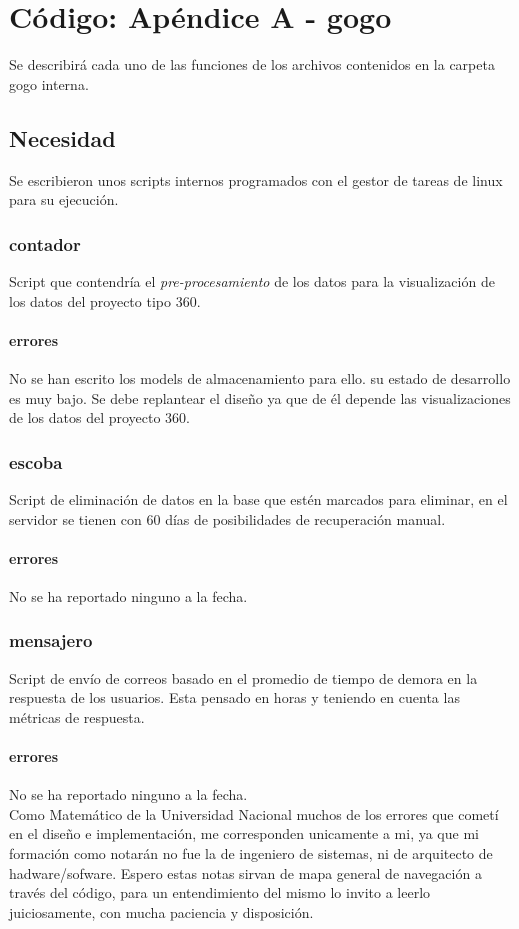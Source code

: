 \documentclass[10pt,a4paper]{book}
\begin{document}
	
	
	\chapter{Código: Apéndice A - gogo}
	
	Se describirá cada uno de las funciones de los archivos contenidos en la carpeta gogo interna.

	\section{Necesidad}
	
	Se escribieron unos scripts internos programados con el gestor de tareas de linux para su ejecución.
	
	\subsection{contador}
	Script que contendría el \textit{pre-procesamiento} de los datos para la visualización de los datos del proyecto tipo 360.
	\subsubsection{errores}
	No se han escrito los models de almacenamiento para ello. su estado de desarrollo es muy bajo. Se debe replantear el diseño ya que de él depende las visualizaciones de los datos del proyecto 360.
	
	\subsection{escoba}
	Script de eliminación de datos en la base que estén marcados para eliminar, en el servidor se tienen con 60 días de posibilidades de recuperación manual.
	\subsubsection{errores}
	No se ha reportado ninguno a la fecha.
	
	\subsection{mensajero}
	Script de envío de correos basado en el promedio de tiempo de demora en la respuesta de los usuarios. Esta pensado en horas y teniendo en cuenta las métricas de respuesta.  
	\subsubsection{errores}
	No se ha reportado ninguno a la fecha.\\
	
	Como Matemático de la Universidad Nacional muchos de los errores que cometí en el diseño e implementación, me corresponden unicamente a mi, ya que mi formación como notarán no fue la de ingeniero de sistemas, ni de arquitecto de hadware/sofware. Espero estas notas sirvan de mapa general de navegación a través del código, para un entendimiento del mismo lo invito a leerlo juiciosamente, con mucha paciencia y disposición.
	
\end{document}
